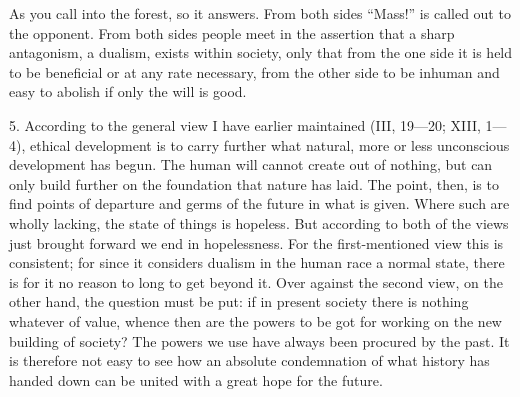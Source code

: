 \documentclass[12pt,a4paper,openany]{book}
\newcommand{\opage}[1]{\marginnote{\footnotesize\textit{[#1]}}}
\begin{document}
As you call into the forest, so it answers. From both sides ``Mass!'' is called out to the opponent. From both sides people
meet in the assertion that a sharp antagonism, a dualism, exists within society, only that from the one side it is held
to be beneficial or at any rate necessary, from the other side to be inhuman and easy to abolish if only the will is good.

5. According to the general view I have earlier maintained (III, 19---20; XIII, 1---4), ethical development is to carry
further what natural, more or less unconscious development has begun. The human will cannot create out of nothing, but can
only build further on the foundation that nature has laid. The point, then, is to find points of departure and germs of
the future in what is given. Where such are wholly lacking, the state of things is hopeless. But according to both of the
views just brought forward we end in hopelessness. For the first-mentioned view
\opage{372}this is consistent; for since it considers dualism in the human race a normal state, there is for it no reason
to long to get beyond it. Over against the second view, on the other hand, the question must be put: if in present
society there is nothing whatever of value, whence then are the powers to be got for working on the new building of
society? The powers we use have always been procured by the past. It is therefore not easy to see how an absolute
condemnation of what history has handed down can be united with a great hope for the future.
\end{document}
